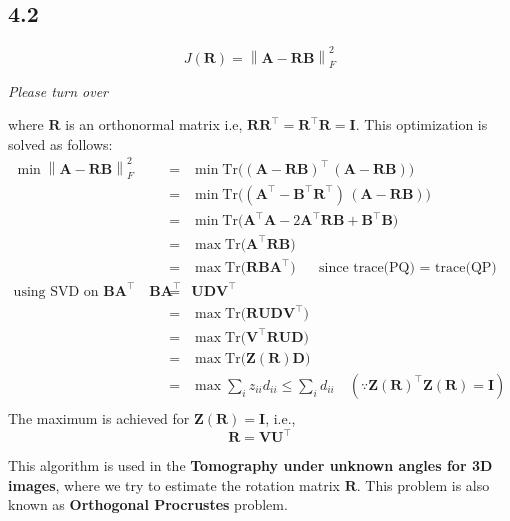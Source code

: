 \documentclass[12pt]{article}
\newcommand{\norm}[1]{\left\lVert #1 \right\rVert}
\begin{document}
\subsection*{4.2}
$$J(\boldsymbol{R}) = \norm{\boldsymbol{A} - \boldsymbol{RB}}_F^2$$
\vspace{1cm}
\begin{center}
	\textit{Please turn over}
\end{center}
\newpage
where $\boldsymbol{R}$ is an orthonormal matrix i.e, $\boldsymbol{R}\boldsymbol{R}^\intercal = \boldsymbol{R}^\intercal \boldsymbol{R} = \boldsymbol{I}$.
This optimization is solved as follows:
\begin{eqnarray*}
	\min \norm{\boldsymbol{A} - \boldsymbol{RB}}_F^2 &=& \min \mathrm{Tr}\bigg((\boldsymbol{A}-\boldsymbol{RB})^\intercal\, (\boldsymbol{A}-\boldsymbol{RB})\bigg)\\
	&=& \min \mathrm{Tr}\bigg((\boldsymbol{A}^\intercal-\boldsymbol{B}^\intercal\boldsymbol{R}^\intercal)\, (\boldsymbol{A}-\boldsymbol{RB})\bigg)\\
	&=& \min \mathrm{Tr}\bigg(\boldsymbol{A}^\intercal\boldsymbol{A}-2\boldsymbol{A}^\intercal\boldsymbol{RB} + \boldsymbol{B}^\intercal\boldsymbol{B}\bigg)\\
	&=& \max \mathrm{Tr}\bigg(\boldsymbol{A}^\intercal\boldsymbol{RB}\bigg)\\
	&=& \max \mathrm{Tr}\bigg(\boldsymbol{RB}\boldsymbol{A}^\intercal\bigg) \:\:\:\quad \text{since trace(PQ) = trace(QP)}\\
\text{using SVD on $\boldsymbol{BA}^\intercal$}\quad \boldsymbol{BA}^\intercal &=& \boldsymbol{UDV}^\intercal\\
&=& \max  \mathrm{Tr}\bigg(\boldsymbol{R}\boldsymbol{UDV}^\intercal\bigg)\\
&=& \max \mathrm{Tr}\bigg(\boldsymbol{V}^\intercal\boldsymbol{RUD}\bigg)\\
&=& \max \mathrm{Tr}\bigg(\boldsymbol{Z(R)}\boldsymbol{D}\bigg)\\
&=& \max \sum \limits_{i} z_{ii}d_{ii} \leq \sum \limits_{i} d_{ii} \quad (\because \boldsymbol{Z(R)}^\intercal \boldsymbol{Z(R)} = \boldsymbol{I})\\
\end{eqnarray*}
The maximum is achieved for $\boldsymbol{Z(R)} = \boldsymbol{I}$, i.e.,
$$\boldsymbol{R} = \boldsymbol{V} \boldsymbol{U}^\intercal$$

This algorithm is used in the \textbf{Tomography under unknown angles for 3D images}, where we try to estimate the rotation matrix $\boldsymbol{R}$. This problem is also known as \textbf{Orthogonal Procrustes} problem.
\end{document}
